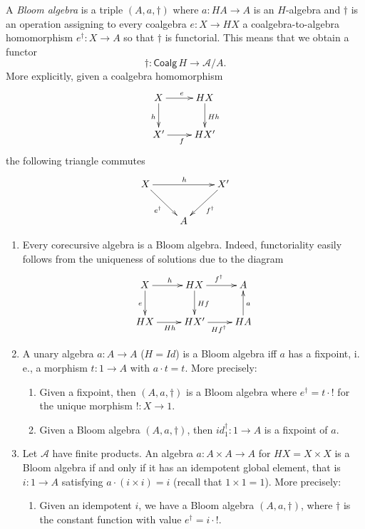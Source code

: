 \documentclass{LMCS}
\theoremstyle{plain}
\theoremstyle{definition}
\numberwithin{equation}{section}
\begin{document}
\begin{defi}
A {\it Bloom algebra} is a triple $(A,a,\dagger)$ where
$a:HA\rightarrow A$ is an $H$-algebra and $\dagger$ is an operation
assigning to every coalgebra $e:X\rightarrow HX$ a
coalgebra-to-algebra homomorphism $e^\dagger:X\rightarrow A$ so that
$\dagger $ is functorial. This means that we obtain a functor
$$\dagger:\mathsf{Coalg}\, H\rightarrow {\mathcal A}/A.$$
More explicitly, given a coalgebra homomorphism
$$
\xymatrix{
X\ar[r]^{e}\ar[d]_{h}&HX\ar[d]^{Hh}\\
X'\ar[r]_{f}&HX'
}
$$\enlargethispage{\baselineskip}
 the following triangle commutes
$$
\xymatrix{
X\ar[rr]^h\ar[dr]_{e^\dagger}&&X'\ar[ld]^{f^\dagger}\\
&A
}
$$
\end{defi}

\begin{exa}\label{ex 3}\hfill
  \begin{enumerate}[label=\({\alph*}]
  \item Every corecursive algebra is a Bloom algebra. Indeed,
    functoriality easily follows from the uniqueness of solutions due
    to the diagram
    $$
    \xymatrix{
      X\ar[r]^{h}\ar[d]_{e}&HX\ar[d]^{Hf}\ar[r]^{f^\dagger}&A\\
      HX\ar[r]_{Hh}&HX'\ar[r]_{Hf^\dagger}&HA\ar[u]_a
    }
    $$

  \item A unary algebra $a: A \to A$ ($H = Id$) is a Bloom algebra iff
    $a$ has a fixpoint, i.\,e., a morphism $t: 1 \to A$ with $a\cdot t
    = t$. More precisely:
    \begin{enumerate}[label=(\arabic*)]
    \item Given a fixpoint, then $(A, a, \dagger)$ is a Bloom algebra
      where $e^\dagger = t \cdot !$ for the unique morphism $!: X \to 1$.
    \item Given a Bloom algebra $(A,a,\dagger)$, then $id_1^\dagger: 1
      \to A$ is a fixpoint of $a$.
    \end{enumerate}
  \item Let $\mathcal A$ have finite products. An algebra $a:A\times
    A\rightarrow A$ for $HX=X\times X$ is a Bloom algebra if and only
    if it has an idempotent global element, that is $i:1\rightarrow A$
    satisfying $a\cdot(i\times i)=i$ (recall that $1\times 1=1$). More
    precisely:

    \begin{enumerate}[label=(\arabic*)]
    \item Given an idempotent $i$, we have a Bloom algebra $(A,a,\dagger)$, where $\dagger $ is the constant function with value $e^\dagger=i\cdot !$.


\end{enumerate}
\end{enumerate}
\end{exa}
\end{document}
